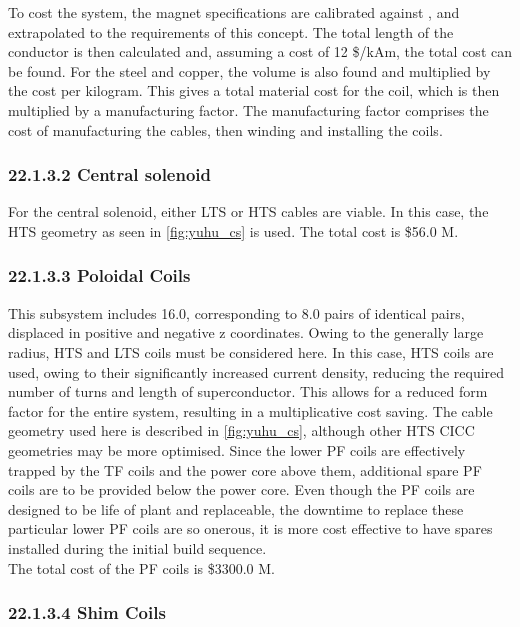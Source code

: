 To cost the system, the magnet specifications are calibrated against \cite{Menard2016}, and extrapolated to the requirements of this concept. The total length of the conductor is then calculated and, assuming a cost of 12 \$/kAm, the total cost can be found. For the steel and copper, the volume is also found and multiplied by the cost per kilogram. This gives a total material cost for the coil, which is then multiplied by a manufacturing factor. The manufacturing factor comprises the cost of manufacturing the cables, then winding and installing the coils. 

\subsubsection*{22.1.3.2 Central solenoid}

For the central solenoid, either LTS or HTS cables are viable. In this case, the HTS geometry as seen in \ref{fig:yuhu_cs} is used. The total cost is \$56.0 M.

\subsubsection*{22.1.3.3 Poloidal Coils}

This subsystem includes 16.0, corresponding to 8.0 pairs of identical pairs, displaced in positive and negative z coordinates. Owing to the generally large radius, HTS and LTS coils must be considered here. In this case, HTS coils are used, owing to their significantly increased current density, reducing the required number of turns and length of superconductor. This allows for a reduced form factor for the entire system, resulting in a multiplicative cost saving. The cable geometry used here is described in \ref{fig:yuhu_cs}, although other HTS CICC geometries may be more optimised.
Since the lower PF coils are effectively trapped by the TF coils and the power core above them, additional spare PF coils are to be provided below the power core. Even though the PF coils are designed to be life of plant and replaceable, the downtime to replace these particular lower PF coils are so onerous, it is more cost effective to have spares installed during the initial build sequence.  \\

The total cost of the PF coils is \$3300.0 M. 

\subsubsection*{22.1.3.4 Shim Coils}

